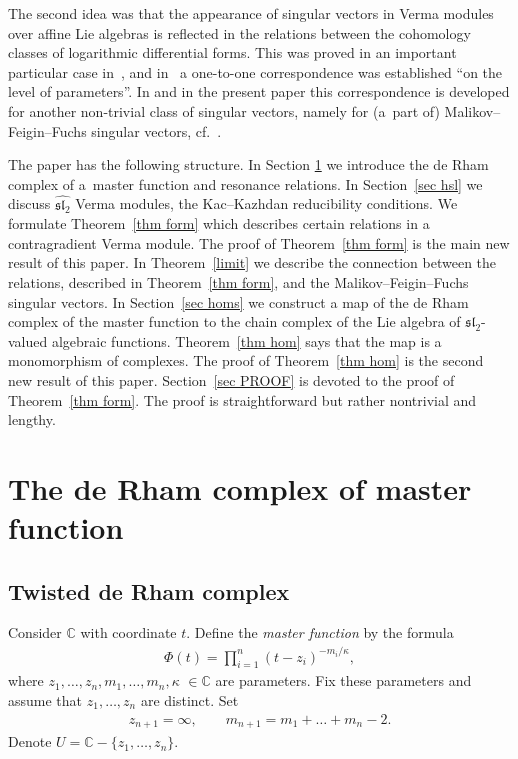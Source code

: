 \documentclass[pdftex]{sigma}
\numberwithin{equation}{section}
\begin{document}
The second idea was that the appearance of {singular vectors} in Verma modules over affine Lie algebras is reflected in the relations between the cohomology classes of logarithmic differential forms. This was proved in an important particular case in~\cite{FSV,FSV+}, and in~\cite{STV} a one-to-one correspondence was established ``on the level of parameters''. In \cite{SV2} and in the present paper this correspondence is developed for another non-trivial class of singular vectors, namely for (a~part of) {Malikov--Feigin--Fuchs} singular vectors, cf.~\cite{MFF}.

The paper has the following structure. In Section \ref{sec DR} we introduce the de Rham complex of a~master function and resonance relations. In Section~\ref{sec hsl} we discuss $\widehat{{\mathfrak{sl}_2}}$ Verma modules, the Kac--Kazhdan reducibility conditions. We formulate Theorem~\ref{thm form} which describes certain relations in a contragradient Verma module. The proof of Theorem~\ref{thm form} is the main new result of this paper. In Theorem~\ref{limit} we describe the connection between the relations, described in Theorem~\ref{thm form}, and the Malikov--Feigin--Fuchs singular vectors. In Section~\ref{sec homs} we construct a map of the de Rham complex of the master function to the chain complex of the Lie algebra of $\mathfrak{sl}_2$-valued algebraic functions. Theorem~\ref{thm hom} says that the map is a monomorphism of complexes. The proof of Theorem~\ref{thm hom} is the second new result of this paper. Section~\ref{sec PROOF} is devoted to the proof of Theorem~\ref{thm form}. The proof is straightforward but rather nontrivial and lengthy.

\section{The de Rham complex of master function} \label{sec DR}

\subsection{Twisted de Rham complex} \label{def dr}
Consider ${\mathbb C}$ with coordinate $t$. Define the {\it master function} by the formula
\begin{gather*}%
\Phi(t) = \prod_{i=1}^n (t-z_i)^{-m_i/\kappa} ,
\end{gather*}
where $z_1, \dots, z_n, m_1,\dots,m_n, \kappa$ $\in{\mathbb C}$ are parameters. Fix these parameters and assume that $z_1,\dots,z_n$ are distinct. Set
\begin{gather*}
z_{n+1}=\infty, \qquad m_{n+1}=m_1+\dots+m_n-2.
\end{gather*}
Denote $U={\mathbb C}-\{z_1,\dots,z_n\}$.
\end{document}

